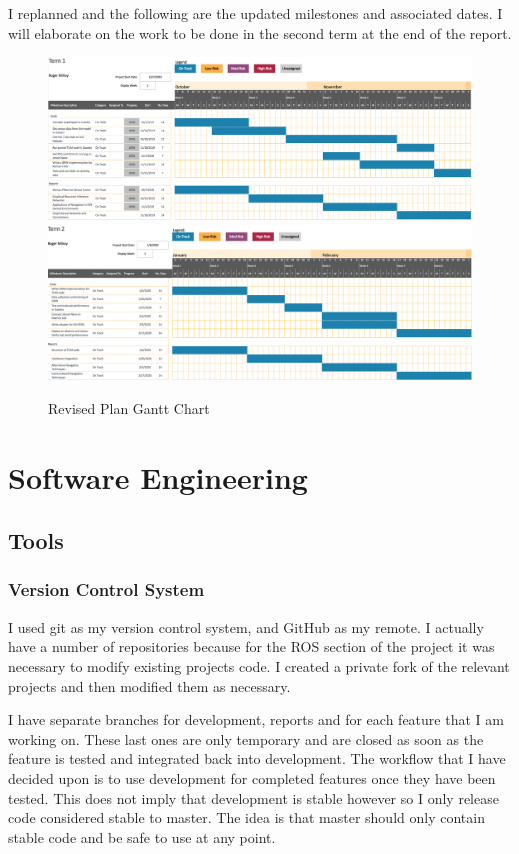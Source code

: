 \documentclass[]{../resources/final_report}
\begin{document}
I replanned and the following are the updated milestones and associated dates. I will elaborate 
on the work to be done in the second term at the end of the report.
\\
\begin{figure}[h]
  \centering
  \includegraphics[width=\textwidth]{Term1GanttChart.png}
  \includegraphics[width=\textwidth]{Term2GanttChart.png}
  \caption{Revised Plan Gantt Chart}
  \label{}
\end{figure}


\chapter{Software Engineering}

\section{Tools}

\subsection{Version Control System}
I used git as my version control system, and GitHub as my remote. I actually have a number of 
repositories because for the ROS section of the project it was necessary to modify existing 
projects code. I created a private fork of the relevant projects and then modified them as necessary.

I have separate branches for development, reports and for each feature that I am working on. 
These last ones are only temporary and are closed as soon as the feature is tested and integrated 
back into development. The workflow that I have decided upon is to use development for completed 
features once they have been tested. This does not imply that development is stable however so I 
only release code considered stable to master. The idea is that master should only contain stable 
code and be safe to use at any point.
\end{document}
